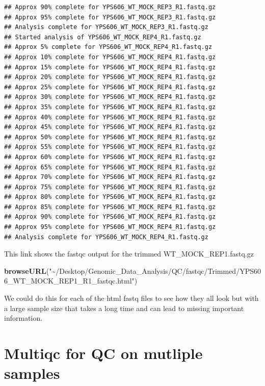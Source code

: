 \documentclass[
]{book}
\newenvironment{Shaded}{\begin{snugshade}}{\end{snugshade}}
\newcommand{\FunctionTok}[1]{\textcolor[rgb]{0.13,0.29,0.53}{\textbf{#1}}}
\newcommand{\NormalTok}[1]{#1}
\newcommand{\StringTok}[1]{\textcolor[rgb]{0.31,0.60,0.02}{#1}}
\begin{document}
\begin{verbatim}
## Approx 90% complete for YPS606_WT_MOCK_REP3_R1.fastq.gz
## Approx 95% complete for YPS606_WT_MOCK_REP3_R1.fastq.gz
## Analysis complete for YPS606_WT_MOCK_REP3_R1.fastq.gz
## Started analysis of YPS606_WT_MOCK_REP4_R1.fastq.gz
## Approx 5% complete for YPS606_WT_MOCK_REP4_R1.fastq.gz
## Approx 10% complete for YPS606_WT_MOCK_REP4_R1.fastq.gz
## Approx 15% complete for YPS606_WT_MOCK_REP4_R1.fastq.gz
## Approx 20% complete for YPS606_WT_MOCK_REP4_R1.fastq.gz
## Approx 25% complete for YPS606_WT_MOCK_REP4_R1.fastq.gz
## Approx 30% complete for YPS606_WT_MOCK_REP4_R1.fastq.gz
## Approx 35% complete for YPS606_WT_MOCK_REP4_R1.fastq.gz
## Approx 40% complete for YPS606_WT_MOCK_REP4_R1.fastq.gz
## Approx 45% complete for YPS606_WT_MOCK_REP4_R1.fastq.gz
## Approx 50% complete for YPS606_WT_MOCK_REP4_R1.fastq.gz
## Approx 55% complete for YPS606_WT_MOCK_REP4_R1.fastq.gz
## Approx 60% complete for YPS606_WT_MOCK_REP4_R1.fastq.gz
## Approx 65% complete for YPS606_WT_MOCK_REP4_R1.fastq.gz
## Approx 70% complete for YPS606_WT_MOCK_REP4_R1.fastq.gz
## Approx 75% complete for YPS606_WT_MOCK_REP4_R1.fastq.gz
## Approx 80% complete for YPS606_WT_MOCK_REP4_R1.fastq.gz
## Approx 85% complete for YPS606_WT_MOCK_REP4_R1.fastq.gz
## Approx 90% complete for YPS606_WT_MOCK_REP4_R1.fastq.gz
## Approx 95% complete for YPS606_WT_MOCK_REP4_R1.fastq.gz
## Analysis complete for YPS606_WT_MOCK_REP4_R1.fastq.gz
\end{verbatim}

This link shows the fastqc output for the trimmed WT\_MOCK\_REP1.fastq.gz

\begin{Shaded}
\begin{Highlighting}[]
\FunctionTok{browseURL}\NormalTok{(}\StringTok{"\textasciitilde{}/Desktop/Genomic\_Data\_Analysis/QC/fastqc/Trimmed/YPS606\_WT\_MOCK\_REP1\_R1\_fastqc.html"}\NormalTok{)}
\end{Highlighting}
\end{Shaded}

We could do this for each of the html fastq files to see how they all look but with a large sample size that takes a long time and can lead to missing important information.

\hypertarget{multiqc-for-qc-on-mutliple-samples}{%
\section{Multiqc for QC on mutliple samples}\label{multiqc-for-qc-on-mutliple-samples}}
\end{document}
